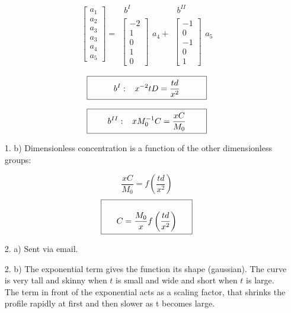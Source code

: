 \documentclass[11pt]{article}
\newcommand{\boxeddm}[2]{%
  \[\fbox{%
      \begin{minipage}{#1\linewidth}%
      $$#2$$%
      \end{minipage}%
    }\]%
}
\begin{document}
\begin{enumerate}
$$
\left[
\begin{array}{c}
a_1\\a_2\\a_3\\a_3\\a_4\\a_5
\end{array}
\right]
= 
\begin{array}{c}
	\begin{array}{c}
		b^I
	\end{array}\\
	\left[
	\begin{array}{c}
		-2\\1\\0\\1\\0
	\end{array}
	\right]
\end{array}
a_4+
\begin{array}{c}
	\begin{array}{c}
		b^{II}
	\end{array}\\
	\left[
	\begin{array}{c}
		-1\\0\\-1\\0\\1
	\end{array}
	\right]
\end{array}
a_5
$$

\boxeddm{.4}{b^I:\,\,\,\,\, x^{-2}tD= \frac{td}{x^2}}
\boxeddm{.4}{b^{II}:\,\,\,\,\, xM_0^{-1}C= \frac{xC}{M_0}}

\item[1. b)] Dimensionless concentration is a function of the other dimensionless groups:

$$\frac{xC}{M_0} = f\left(\frac{td}{x^2}\right)$$
\boxeddm{.3}{C = \frac{M_0}{x}f\left(\frac{td}{x^2}\right)}


\item[2. a)] Sent via email.


\item[2. b)]  The exponential term gives the function its shape (gaussian).  The curve is very tall and skinny when $t$ is small and wide and short when $t$ is large. The term in front of the exponential acts as a scaling factor, that shrinks the profile rapidly at first and then slower as t becomes large. 



\end{enumerate}
\end{document}
